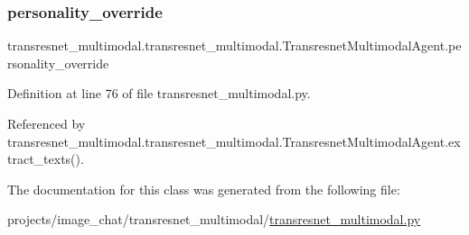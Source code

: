 \mbox{\label{classtransresnet__multimodal_1_1transresnet__multimodal_1_1TransresnetMultimodalAgent_a8c5584904283db949a2c79255720a7f1}} 
\subsubsection{\texorpdfstring{personality\+\_\+override}{personality\_override}}
{\footnotesize\ttfamily transresnet\+\_\+multimodal.\+transresnet\+\_\+multimodal.\+Transresnet\+Multimodal\+Agent.\+personality\+\_\+override}



Definition at line 76 of file transresnet\+\_\+multimodal.\+py.



Referenced by transresnet\+\_\+multimodal.\+transresnet\+\_\+multimodal.\+Transresnet\+Multimodal\+Agent.\+extract\+\_\+texts().



The documentation for this class was generated from the following file\+:\begin{DoxyCompactItemize}
\item 
projects/image\+\_\+chat/transresnet\+\_\+multimodal/\hyperlink{projects_2image__chat_2transresnet__multimodal_2transresnet__multimodal_8py}{transresnet\+\_\+multimodal.\+py}\end{DoxyCompactItemize}
